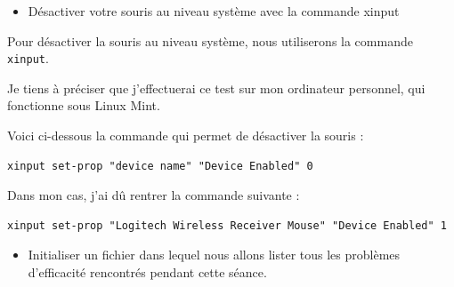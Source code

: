 \documentclass[12pt]{article}
\begin{document}
\begin{itemize}
  \item Désactiver votre souris au niveau système avec la commande xinput
\end{itemize}

\vspace{0.3cm}

Pour désactiver la souris au niveau système, nous utiliserons la commande \texttt{xinput}.

\vspace{0.3cm}

Je tiens à préciser que j'effectuerai ce test sur mon ordinateur personnel, qui fonctionne sous Linux Mint.

\vspace{0.3cm}

Voici ci-dessous la commande qui permet de désactiver la souris :

\begin{verbatim}
xinput set-prop "device name" "Device Enabled" 0
\end{verbatim}

Dans mon cas, j'ai dû rentrer la commande suivante :

\begin{verbatim}
xinput set-prop "Logitech Wireless Receiver Mouse" "Device Enabled" 1
\end{verbatim}

\vspace{0.3cm}

\begin{itemize}
  \item Initialiser un fichier dans lequel nous allons lister tous les problèmes d'efficacité rencontrés pendant cette séance.
\end{itemize}
\vspace{0.3cm}
\end{document}
